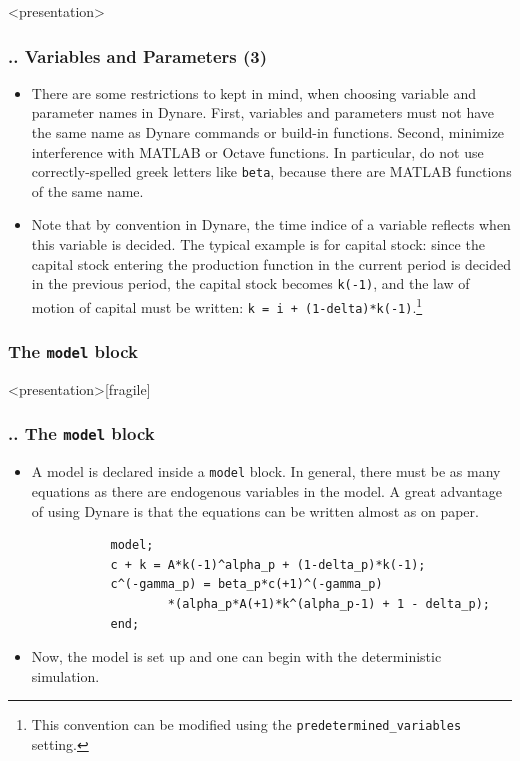 \documentclass[11pt,aspectratio=169]{beamer}
\begin{document}
\begin{frame}<presentation>
	\frametitle{{\thesection.\thesubsection.\thesubsubsection} Variables and Parameters (3)}
	\begin{itemize}
		\justifying
		\item There are some restrictions to kept in mind, when choosing variable and parameter names in Dynare. First, variables and parameters must not have the same name as Dynare commands or build-in functions. Second, minimize interference with MATLAB or Octave functions. In particular, do not use correctly-spelled greek letters like \texttt{beta}, because there are MATLAB functions of the same name.
		\item Note that by convention in Dynare, the time indice of a variable reflects when this variable is decided. The typical example is for capital stock: since the capital stock entering the production function in the current period is decided in the previous period, the capital stock becomes \texttt{k(-1)}, and the law of motion of capital must be written: \texttt{k = i + (1-delta)*k(-1)}.\footnote{This convention can be modified using the \texttt{predetermined\_variables} setting.} 
	\end{itemize}
\end{frame}
\subsubsection{The \texttt{model} block}
\begin{frame}<presentation>[fragile]
	\frametitle{{\thesection.\thesubsection.\thesubsubsection} The \texttt{model} block}
	\begin{itemize}
		\justifying
		\item A model is declared inside a \texttt{model} block. In general, there must be as many equations as there are endogenous variables in the model. A great advantage of using Dynare is that the equations can be written almost as on paper.
		\begin{verbatim}
		   model;
		   c + k = A*k(-1)^alpha_p + (1-delta_p)*k(-1);
		   c^(-gamma_p) = beta_p*c(+1)^(-gamma_p)
		           *(alpha_p*A(+1)*k^(alpha_p-1) + 1 - delta_p);
		   end;
		\end{verbatim}
		\item Now, the model is set up and one can begin with the deterministic simulation. 
	\end{itemize}
\end{frame}
\end{document}
